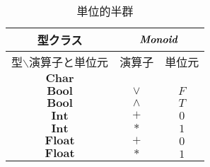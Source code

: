 \documentclass[a5paper,draft]{jsbook}
\newcommand{\mathTypeParameter}[1]{\mathbf{#1}}
\newcommand{\mathTypeName}[1]{\textbf{#1}}
\newcommand{\mathTypeClass}[1]{\textbf{\emph{#1}}} %
\newcommand{\hsklBool}{\mathTypeParameter{Bool}}
\newcommand{\hsklChar}{\mathTypeParameter{Char}}
\newcommand{\hsklFloat}{\mathTypeParameter{Float}}
\begin{document}
\begin{table}
\caption{単位的半群}
\label{tab:monoids}
\begin{center}
\begin{tabular}{||c||c|c||}
\hline
型クラス
    &\multicolumn{2}{|c||}{$\mathTypeClass{Monoid}$}\\
\hline\hline
型$\backslash$演算子と単位元
    &演算子
    &単位元\\
\hline
$\hsklChar$
    &
    &\\
\hline
$\hsklBool$
    &$\vee$
    &$F$\\
\hline
$\hsklBool$
    &$\wedge$
    &$T$\\
\hline
$\mathTypeName{Int}$
    &$+$
    &$0$\\
\hline
$\mathTypeName{Int}$
    &$*$
    &$1$\\
\hline
$\hsklFloat$
    &$+$
    &$0$\\
\hline
$\hsklFloat$
    &$*$
    &$1$\\
\hline
\end{tabular}
\end{center}
\end{table}
\end{document}
